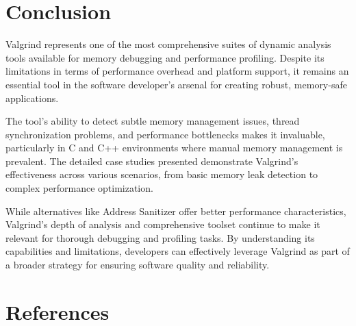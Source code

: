 \documentclass[11pt,a4paper]{article}
\begin{document}
\section{Conclusion}

Valgrind represents one of the most comprehensive suites of dynamic analysis tools available for memory debugging and performance profiling. Despite its limitations in terms of performance overhead and platform support, it remains an essential tool in the software developer's arsenal for creating robust, memory-safe applications.

The tool's ability to detect subtle memory management issues, thread synchronization problems, and performance bottlenecks makes it invaluable, particularly in C and C++ environments where manual memory management is prevalent. The detailed case studies presented demonstrate Valgrind's effectiveness across various scenarios, from basic memory leak detection to complex performance optimization.

While alternatives like Address Sanitizer offer better performance characteristics, Valgrind's depth of analysis and comprehensive toolset continue to make it relevant for thorough debugging and profiling tasks. By understanding its capabilities and limitations, developers can effectively leverage Valgrind as part of a broader strategy for ensuring software quality and reliability.

\section{References}
\end{document}
